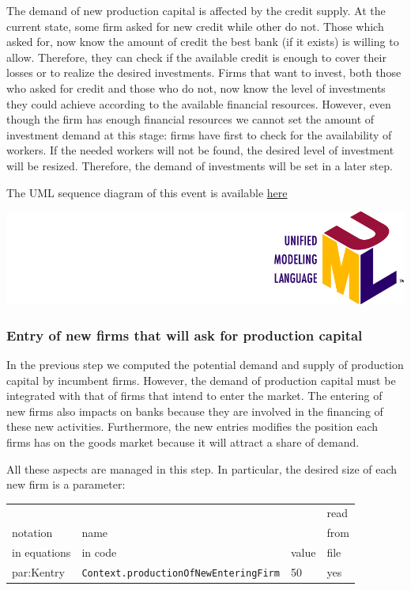 \documentclass{book}
\newcommand{\doclocation}{file:///Users/giulioni/Documents/workspace/gabriele/docs}
\begin{document}
The demand of new production capital is affected by the credit supply.
At the current state, some firm asked for new credit while other do not. 
Those which asked for, now know the amount of credit the best bank (if it exists) is willing to allow.
Therefore, they can check if the available credit is enough to cover their losses or to realize the desired investments. 
Firms that want to invest, both those who asked for credit and those who do not, now know the level of investments they could achieve according to the available financial resources. 
However, even though the firm has enough financial resources we cannot set the amount of investment demand at this stage: firms have first to check for the availability of workers. If the needed workers will not be found, the desired level of investment will be resized. Therefore, the demand of investments will be set in a later step.

\vskip3mm
The UML sequence diagram of this event is available \href{\doclocation/umldoc/setPossibleInvestment.html}{here}
\begin{marginfigure}
	\includegraphics[scale=0.1]{uml.png}
\end{marginfigure}


\subsubsection{Entry of new firms that will ask for production capital}

In the previous step we computed the potential demand and supply of production capital by incumbent firms. However, the demand of production capital must be integrated with that of firms that intend to enter the market. 
The entering of new firms also impacts on banks because they are involved in the financing of these new activities. Furthermore, the new entries modifies the position each firms has on the goods market because it will attract a share of demand.

All these aspects are managed in this step.
In particular, the desired size of each new firm is a parameter:\\

\vskip2mm
\noindent
\begin{tabular}{l l l l}
	\hline
	& &&read\\
	notation& name &&from\\
	in equations& in code&value&file\\
	\hline
	\hline
 \gls{par:Kentry}&\verb+Context.productionOfNewEnteringFirm+&50&yes\\
	\hline
\end{tabular}
\end{document}
